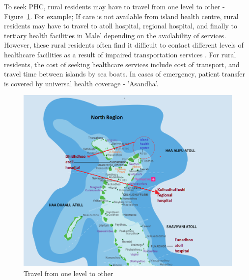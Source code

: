 To seek PHC, rural residents may have to travel from one level to other -Figure~\ref{map}. For example; If care is not available from island health centre, rural residents may have to travel to atoll hospital, regional hospital, and finally to tertiary health facilities in Male' depending on the availability of services. However, these rural residents often find it difficult to contact different levels of healthcare facilities as a result of impaired transportation services \cite{MOH:health:plan}. For rural residents, the cost of seeking healthcare services include cost of transport, and travel time between islands by sea boats. In cases of emergency, patient transfer is covered by universal health coverage - 'Asandha'. 

\begin{figure}[H]
\caption{Travel from one level to other}
\label{map}
\centering
\includegraphics[width=1.0\textwidth]{northmap.png}
\end{figure}


